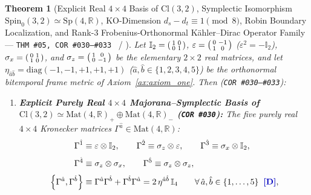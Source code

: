 \documentclass[11pt,a4paper]{article}
\newcommand{\catD}{\text{\textbf{\textcolor{blue!75!black}{[D]}}}}
\newcommand{\catH}{\text{\textbf{\textcolor{orange!80!black}{[H]}}}}
\theoremstyle{definition}
\theoremstyle{plain}
\newtheorem{theorem}[axiom]{Theorem}
\theoremstyle{remark}
\begin{document}
\begin{theorem}[Explicit Real $4\times 4$ Basis of $\mathrm{Cl}(3,2)$, Symplectic Isomorphism $\mathrm{Spin}_0(3,2) \simeq \mathrm{Sp}(4,\mathbb{R})$, KO-Dimension $d_s - d_t \equiv 1 \pmod 8$, Robin Boundary Localization, and Rank-$3$ Frobenius-Orthonormal K\"ahler--Dirac Operator Family --- \texttt{THM~\#05, COR~\#030--\#033} \catD\ / \catH]\label{thm:c6_clifford_sp4_spinors}
Let $\mathbb{I}_2 = \begin{psmallmatrix} 1 & 0 \\ 0 & 1 \end{psmallmatrix}$, $\varepsilon = \begin{psmallmatrix} 0 & -1 \\ 1 & 0 \end{psmallmatrix}$ ($\varepsilon^2 = -\mathbb{I}_2$), $\sigma_x = \begin{psmallmatrix} 0 & 1 \\ 1 & 0 \end{psmallmatrix}$, and $\sigma_z = \begin{psmallmatrix} 1 & 0 \\ 0 & -1 \end{psmallmatrix}$ be the elementary $2\times 2$ real matrices, and let $\eta_{\hat{a}\hat{b}} = \mathrm{diag}(-1, -1, +1, +1, +1)$ ($\hat{a}, \hat{b} \in \{1,2,3,4,5\}$) be the orthonormal bitemporal frame metric of Axiom~\ref{ax:axiom_one}. Then (\texttt{COR~\#030--\#033}):
\begin{enumerate}[label=(\roman*)]
  \item \textbf{Explicit Purely Real $4\times 4$ Majorana--Symplectic Basis of $\mathrm{Cl}(3,2) \simeq \mathrm{Mat}(4,\mathbb{R})_+ \oplus \mathrm{Mat}(4,\mathbb{R})_-$ (\texttt{COR~\#030}):}
  The five purely real $4\times 4$ Kronecker matrices $\Gamma^{\hat{a}} \in \mathrm{Mat}(4, \mathbb{R})$:
  \begin{align}
  \Gamma^{\hat{1}} &\equiv \varepsilon \otimes \mathbb{I}_2, \qquad
  \Gamma^{\hat{2}} \equiv \sigma_z \otimes \varepsilon, \qquad
  \Gamma^{\hat{3}} \equiv \sigma_x \otimes \mathbb{I}_2, \nonumber \\[3pt]
  \Gamma^{\hat{4}} &\equiv \sigma_z \otimes \sigma_x, \qquad
  \Gamma^{\hat{5}} \equiv \sigma_z \otimes \sigma_z, \nonumber \\[3pt]
  \left\{\Gamma^{\hat{a}}, \Gamma^{\hat{b}}\right\} &\equiv \Gamma^{\hat{a}}\Gamma^{\hat{b}} + \Gamma^{\hat{b}}\Gamma^{\hat{a}} = 2\,\eta^{\hat{a}\hat{b}}\,\mathbb{I}_4 \qquad \forall\,\hat{a},\hat{b} \in \{1,\dots,5\} \;\;\catD, \label{eq:c6_clifford_real_basis}

\end{align}
\end{enumerate}
\end{theorem}
\end{document}
